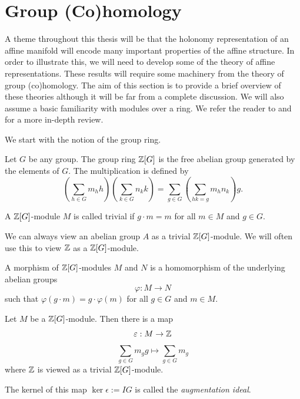 \section{Group (Co)homology}
A theme throughout this thesis will be that the holonomy representation of an
affine manifold will encode many important properties of the affine structure.
In order to illustrate this, we will need to develop some of the theory of
affine representations. These results will require some machinery from the
theory of group (co)homology. The aim of this section is to provide a brief
overview of these theories although it will be far from a complete discussion.
We will also assume a basic familiarity with modules over a ring. We refer the
reader to \cite{Weibel_1994} and \cite{brown2012cohomology} for a more in-depth
review.

We start with the notion of the group ring.

\begin{definition}
    Let $G$ be any group. The group ring $\mathbb{Z}[G]$ is the free abelian group generated by the elements of $G$. The multiplication
    is defined by
    $$
        \left(\sum_{h \in G}m_h h\right)\left(\sum_{k \in G}n_k k\right) = \sum_{g \in G}\left(\sum_{hk = g}m_hn_k\right)g.
    $$
\end{definition}

\begin{definition}
    A $\mathbb{Z}[G]$-module $M$ is called trivial if $g \cdot m = m$ for all $m \in M$ and $g \in G$.
\end{definition}
\begin{remark}
    We can always view an abelian group $A$ as a trivial $\mathbb{Z}[G]$-module. We will often use this to view $\mathbb{Z}$ as a $\mathbb{Z}[G]$-module.
\end{remark}

\begin{definition}
    A morphism of $\mathbb{Z}[G]$-modules $M$ and $N$ is a homomorphism of the underlying abelian groups
    $$
        \varphi : M \to N
    $$
    such that $\varphi(g \cdot m) = g \cdot \varphi(m)$ for all $g \in G$ and $m \in M$.
\end{definition}
\begin{eg}
    Let $M$ be a $\mathbb{Z}[G]$-module. Then there is a map
    $$
        \varepsilon : M \to \mathbb{Z}
    $$
    $$
        \sum_{g \in G}m_g g\mapsto \sum_{g \in G} m_g
    $$
    where $\mathbb{Z}$ is viewed as a trivial $\mathbb{Z}[G]$-module.
\end{eg}
\begin{definition}
    The kernel of this map $\ker \epsilon := IG$ is called the \emph{augmentation ideal}.
\end{definition}

